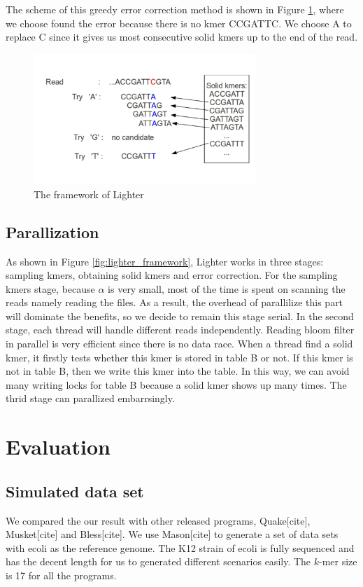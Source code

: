\documentclass[10pt]{article}
\begin{document}
The scheme of this greedy error correction method is shown in Figure \ref{fig:error_correction}, where we choose found the error because there is no kmer CCGATTC. We choose A to replace C since it gives us most consecutive solid kmers up to the end of the read.

\begin{figure}[h!]
\begin{center}
\includegraphics[width=0.75\textwidth]{ErrorCorrection.jpg}
\caption{The framework of Lighter\label{fig:error_correction}}
\end{center}
\end{figure}

\subsection*{Parallization}
As shown in Figure \ref{fig:lighter_framework}, Lighter works in three stages: sampling kmers, obtaining solid kmers and error correction. For the sampling kmers stage, because $\alpha$ is very small, most of the time is spent on scanning the reads namely reading the files. As a result, the overhead of parallilize this part will dominate the benefits, so we decide to remain this stage serial. In the second stage, each thread will handle different reads independently. Reading bloom filter in parallel is very efficient since there is no data race. When a thread find a solid kmer, it firstly tests whether this kmer is stored in table B or not. If this kmer is not in table B, then we write this kmer into the table. In this way, we can avoid many writing locks for table B because a solid kmer shows up many times. The thrid stage can parallized embarrsingly.

\section*{Evaluation}
\subsection*{Simulated data set}
We compared the our result with other released programs, Quake[cite], Musket[cite] and Bless[cite]. We use Mason[cite] to generate a set of data sets with ecoli as the reference genome. The K12 strain of ecoli is fully sequenced and has the decent length for us to generated different scenarios easily. The $k$-mer size is 17 for all the programs.
\end{document}
